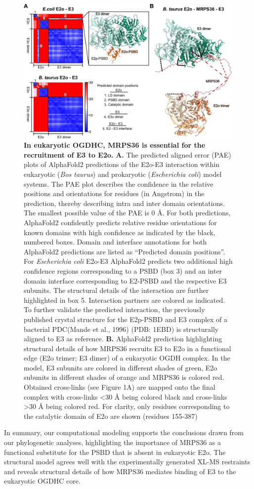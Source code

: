 \begin{figure}[t!]
    \centering
    \includegraphics[]{Chapter.5/Figures/Figure4.png}
    \caption{\textbf{In eukaryotic OGDHC, MRPS36 is essential for the recruitment of E3 to E2o.} \textbf{A.} The predicted aligned error (PAE) plots of AlphaFold2 predictions of the E2o-E3 interaction within eukaryotic (\emph{Bos taurus}) and prokaryotic (\emph{Escherichia coli}) model systems. The PAE plot describes the confidence in the relative positions and orientations for residues (in Angstrom) in the prediction, thereby describing intra and inter domain orientations. The smallest possible value of the PAE is 0 Å. For both predictions, AlphaFold2 confidently predicts relative residue orientations for known domains with high confidence as indicated by the black, numbered boxes. Domain and interface annotations for both AlphaFold2 predictions are listed as “Predicted domain positions”. For \emph{Escherichia coli} E2o-E3 AlphaFold2 predicts two additional high confidence regions corresponding to a PSBD (box 3) and an inter domain interface corresponding to E2-PSBD and the respective E3 subunits. The structural details of the interaction are further highlighted in box 5. Interaction partners are colored as indicated. To further validate the predicted interaction, the previously published crystal structure for the E2p-PSBD and E3 complex of a bacterial PDC(Mande et al., 1996) (PDB: 1EBD) is structurally aligned to E3 as reference. \textbf{B.} AlphaFold2 prediction highlighting structural details of how MRPS36 recruits E3 to E2o in a functional edge (E2o trimer; E3 dimer) of a eukaryotic OGDH complex. In the model, E3 subunits are colored in different shades of green, E2o subunits in different shades of orange and MRPS36 is colored red. Obtained cross-links (see Figure 1A) are mapped onto the final complex with cross-links <30 Å being colored black and cross-links >30 Å being colored red. For clarity, only residues corresponding to the catalytic domain of E2o are shown (residues 155-387)}
    \label{fig:ch5_fig4}
\end{figure}
In summary, our computational modeling supports the conclusions drawn from our phylogenetic analyses, highlighting the importance of MRPS36 as a functional substitute for the PSBD that is absent in eukaryotic E2o. The structural model agrees well with the experimentally generated XL-MS restraints and reveals structural details of how MRPS36 mediates binding of E3 to the eukaryotic OGDHC core.
%
